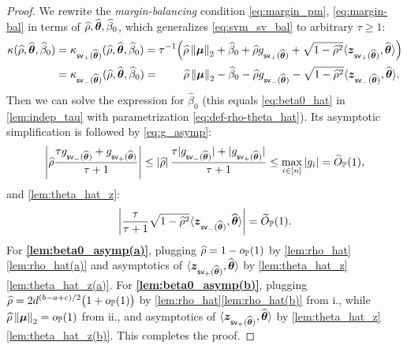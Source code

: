 \begin{proof}
    We rewrite the \emph{margin-balancing} condition \cref{eq:margin_pm}, \eqref{eq:margin-bal} in terms of $\hat\rho, \hat\vtheta, \hat\beta_0$, which generalizes \cref{eq:svm_sv_bal} to arbitrary $\tau \ge 1$:
    \begin{equation*}
        \begin{aligned}
           \kappa(\hat\rho, \hat\vtheta, \hat\beta_0) & = \kappa_{\mathsf{sv}_+(\hat\vtheta)}(\hat\rho, \hat\vtheta, \hat\beta_0) = 
           \tau^{-1} \Bigl(
           \hat\rho \norm{\vmu}_2 + \hat\beta_0 + \hat\rho g_{\mathsf{sv}_+(\hat\vtheta)} + \sqrt{1 - \hat\rho^2} \< \zz_{\mathsf{sv}_+(\hat\vtheta)}, \hat\vtheta \> 
           \Bigr)
           \\
           & = \kappa_{\mathsf{sv}_-(\hat\vtheta)}(\hat\rho, \hat\vtheta, \hat\beta_0) = 
           \phantom{ \tau^{-1} \Bigl( }
           \hat\rho \norm{\vmu}_2 - \hat\beta_0 - \hat\rho g_{\mathsf{sv}_-(\hat\vtheta)} - \sqrt{1 - \hat\rho^2} \< \zz_{\mathsf{sv}_-(\hat\vtheta)}, \hat\vtheta \>
           .
        \end{aligned}
    \end{equation*}
    Then we can solve the expression for $\hat\beta_0$ (this equals \cref{eq:beta0_hat} in \cref{lem:indep_tau} with parametrization \cref{eq:def-rho-theta_hat}). Its asymptotic simplification is followed by \cref{eq:g_asymp}:
    \begin{equation*}
        \abs{\hat\rho \frac{\tau g_{\mathsf{sv}_-(\hat\vtheta)} + g_{\mathsf{sv}_+(\hat\vtheta)} }{\tau + 1} } 
        \le \abs{\hat\rho} \frac{\tau |g_{\mathsf{sv}_-(\hat\vtheta)}| + |g_{\mathsf{sv}_+(\hat\vtheta)}| }{\tau + 1}
        \le \max_{i \in [n]} \abs{g_i} = \wt O_\P(1),
    \end{equation*}
    and \cref{lem:theta_hat_z}:
    \begin{equation*}
        \abs{
        \frac{\tau}{\tau + 1} \sqrt{1 - \hat\rho^2}\< \zz_{\mathsf{sv}_-(\hat\vtheta)}, \hat\vtheta \>
        } = \wt O_\P(1).
    \end{equation*}
    For \textbf{\ref{lem:beta0_asymp(a)}}, plugging $\hat\rho = 1 - o_\P(1)$ by \cref{lem:rho_hat}\ref{lem:rho_hat(a)} and asymptotics of $\< \zz_{\mathsf{sv}_+(\hat\vtheta)}, \hat\vtheta \>$ by \cref{lem:theta_hat_z}\ref{lem:theta_hat_z(a)}. For \textbf{\ref{lem:beta0_asymp(b)}}, plugging $\hat\rho = 2d^{(b-a+c)/2}\bigl(1 + o_\P(1)\bigr)$ by \cref{lem:rho_hat}\ref{lem:rho_hat(b)} from i., while $\hat\rho\norm{\bmu}_2 = o_\P(1)$ from ii., and asymptotics of $\< \zz_{\mathsf{sv}_+(\hat\vtheta)}, \hat\vtheta \>$ by \cref{lem:theta_hat_z}\ref{lem:theta_hat_z(b)}. This completes the proof.
\end{proof}


